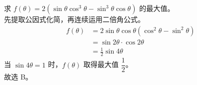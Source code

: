 \documentclass[12pt,a4paper]{exam-zh}
\begin{document}
\begin{solution}
    求 $f(\theta) = 2\left(\sin\theta\cos^3\theta - \sin^3\theta\cos\theta\right)$ 的最大值。 \\
    先提取公因式化简，再连续运用二倍角公式。
    \begin{align*}
        f(\theta) &= 2\sin\theta\cos\theta\left(\cos^2\theta-\sin^2\theta\right) \\
        &= \sin2\theta \cdot \cos2\theta \\
        &= \frac{1}{2}\sin4\theta
    \end{align*}
    当 $\sin4\theta = 1$ 时，$f(\theta)$ 取得最大值 $\dfrac{1}{2}$。 \\
    故选 B。
\end{solution}




\end{document}
